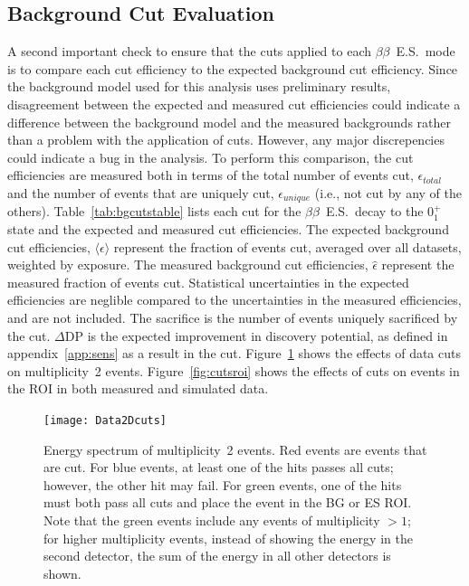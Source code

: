 \documentclass[notitlepage,rmp,aps,10pt]{revtex4-1}
\newcommand{\bb}{${\beta \beta}$}
\newcommand{\bbes}{\bb~E.S.}
\newcommand{\SP}[3]{$#1^{#2}_{#3}$}
\begin{document}
\subsection{Background Cut Evaluation}
A second important check to ensure that the cuts applied to each \bbes\ mode is to compare each cut efficiency to the expected background cut efficiency.
Since the background model used for this analysis uses preliminary results, disagreement between the expected and measured cut efficiencies could indicate a difference between the background model and the measured backgrounds rather than a problem with the application of cuts.
However, any major discrepencies could indicate a bug in the analysis.
To perform this comparison, the cut efficiencies are measured both in terms of the total number of events cut, $\epsilon_{total}$ and the number of events that are uniquely cut, $\epsilon_{unique}$ (i.e., not cut by any of the others).
Table~\ref{tab:bgcutstable} lists each cut for the \bbes\ decay to the \SP{0}{+}{1} state and the expected and measured cut efficiencies.
The expected background cut efficiencies, $\langle\epsilon\rangle$ represent the fraction of events cut, averaged over all datasets, weighted by exposure.
The measured background cut efficiencies, $\hat{\epsilon}$ represent the measured fraction of events cut.
Statistical uncertainties in the expected efficiencies are neglible compared to the uncertainties in the measured efficiencies, and are not included.
The sacrifice is the number of events uniquely sacrificed by the cut.
$\Delta \mathrm{DP}$ is the expected improvement in discovery potential, as defined in appendix~\ref{app:sens} as a result in the cut.
Figure~\ref{fig:datacuts2D} shows the effects of data cuts on multiplicity~2 events.
Figure~\ref{fig:cutsroi} shows the effects of cuts on events in the ROI in both measured and simulated data.

\begin{figure}
  \centering
  \texttt{[image: Data2Dcuts]}
  \caption[Effect of data cuts on measured multiplicity 2 events]{\label{fig:datacuts2D}
    Energy spectrum of multiplicity~2 events. Red events are events that are cut. For blue events, at least one of the hits passes all cuts; however, the other hit may fail. For green events, one of the hits must both pass all cuts and place the event in the BG or ES ROI. Note that the green events include any events of multiplicity $>1$; for higher multiplicity events, instead of showing the energy in the second detector, the sum of the energy in all other detectors is shown.
  }
\end{figure}
\end{document}
